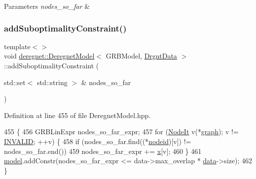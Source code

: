\begin{DoxyParams}{Parameters}
{\em nodes\+\_\+so\+\_\+far} & \\
\hline
\end{DoxyParams}
\mbox{\label{classderegnet_1_1DeregnetModel_a37d1e4b40f89d3f198196863a8c1d321}} 
\subsubsection{\texorpdfstring{add\+Suboptimality\+Constraint()}{addSuboptimalityConstraint()}\hspace{0.1cm}{\footnotesize\ttfamily [2/3]}}
{\footnotesize\ttfamily template$<$$>$ \\
void \hyperlink{classderegnet_1_1DeregnetModel}{deregnet\+::\+Deregnet\+Model}$<$ G\+R\+B\+Model, \hyperlink{classderegnet_1_1DrgntData}{Drgnt\+Data} $>$\+::add\+Suboptimality\+Constraint (\begin{DoxyParamCaption}\item[{std\+::set$<$ std\+::string $>$ \&}]{nodes\+\_\+so\+\_\+far }\end{DoxyParamCaption})\hspace{0.3cm}{\ttfamily [inline]}}



Definition at line 455 of file Deregnet\+Model.\+hpp.


\begin{DoxyCode}
455                                                                                                    \{
456     GRBLinExpr nodes\_so\_far\_expr;
457     \textcolor{keywordflow}{for} (\hyperlink{namespacederegnet_ac34314e1b5f456fc6d1bb9d96316de4a}{NodeIt} v(*\hyperlink{classderegnet_1_1DeregnetModel_a3cd2f54b8e061ef5bed32708d9bc1ef1}{graph}); v != \hyperlink{usinglemon_8hpp_adf770fe2eec438e3758ffe905dbae208}{INVALID}; ++v) \{
458         \textcolor{keywordflow}{if} (nodes\_so\_far.find((*\hyperlink{classderegnet_1_1DeregnetModel_adfebf6f9983c9ccc934469a79381fb78}{nodeid})[v]) != nodes\_so\_far.end())
459             nodes\_so\_far\_expr += \hyperlink{classderegnet_1_1DeregnetModel_a360c980f3fec4dfbab50e9bb06a933a8}{x}[v];
460     \}
461     \hyperlink{classderegnet_1_1DeregnetModel_a30d525de2086e342b33fe3e45ede4947}{model}.addConstr(nodes\_so\_far\_expr <= data->max\_overlap * \hyperlink{classderegnet_1_1DeregnetModel_ad5399761cf6293a702f3800bda4806d1}{data}->size);
462 \}
\end{DoxyCode}
\mbox{\label{classderegnet_1_1DeregnetModel_a266c4a7f90a2884512f98ddcca6750bc}} 
